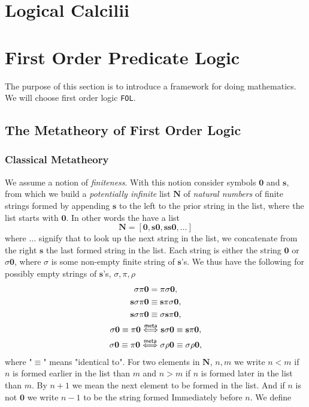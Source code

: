 \appendix
\section{Logical Calcilii}
\section{First Order Predicate Logic}
The purpose of this section is to introduce a framework for doing mathematics. We will choose first order logic \verb|FOL|.
\subsection{The Metatheory of First Order Logic}
\subsubsection{Classical Metatheory}
We assume a notion of \emph{finiteness}. With this notion consider symbols $\mathbf{0}$ and $\mathbf{s}$, from which we build a \emph{potentially infinite} list $\mathbf{N}$ of \emph{natural numbers} of finite strings formed by appending $\mathbf{s}$ to the left to the prior string in the list, where the list starts with $\mathbf{0}$. In other words the have a list
$$\mathbf{N} = [\mathbf{0},\mathbf{s0},\mathbf{ss0},\dots]$$ 
where $\dots$ signify that to look up the next string in the list, we concatenate from the right $\mathbf{s}$ the last formed string in the list. Each string is either the string $\mathbf{0}$ or $\sigma\mathbf{0}$, where $\sigma$ is some non-empty finite string of $\mathbf{s}$'s. We thus have the following for possibly empty strings of $\mathbf{s}$'s, $\sigma, \pi,\rho$
\begin{gather*}
    \sigma\pi \mathbf{0} = \pi\sigma \mathbf{0},\\
    \mathbf{s}\sigma\pi\mathbf{0} \equiv \mathbf{s}\pi\sigma\mathbf{0},\\
    \mathbf{s}\sigma\pi\mathbf{0}\equiv \sigma \mathbf{s}\pi\mathbf{0},\\
    \sigma\mathbf{0} \equiv \pi\mathbf{0} \mathrel{\overset{\mathsf{meta}}{\Longleftrightarrow}} \mathbf{s}\sigma\mathbf{0}\equiv \mathbf{s}\pi\mathbf{0},\\
    \sigma\mathbf{0}\equiv \pi\mathbf{0} \mathrel{\overset{\mathsf{meta}}{\Longleftrightarrow}} \sigma\rho\mathbf{0}\equiv \sigma\rho\mathbf{0}, 
\end{gather*}
where "$\equiv$" means "identical to". For two elements in $\mathbf{N}$, $n,m$ we write $n<m$ if $n$ is formed earlier in the list than $m$ and $n>m$ if $n$ is formed later in the list than $m$. By $n+1$ we mean the next element to be formed in the list. And if $n$ is not $\mathbf{0}$ we write $n-1$ to be the string formed Immediately before $n$. We define 
